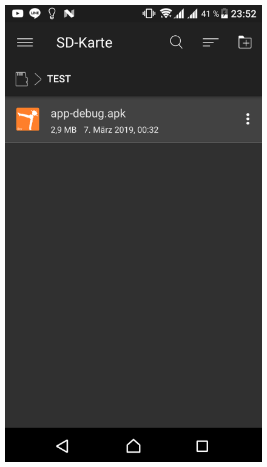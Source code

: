 \begin{enumerate}
\begin{figure}[h]
		[.22\linewidth]{\includegraphics[scale=.06]{chapters/07_appendix/img/file_browser.png}}

\end{figure}
\end{enumerate}
